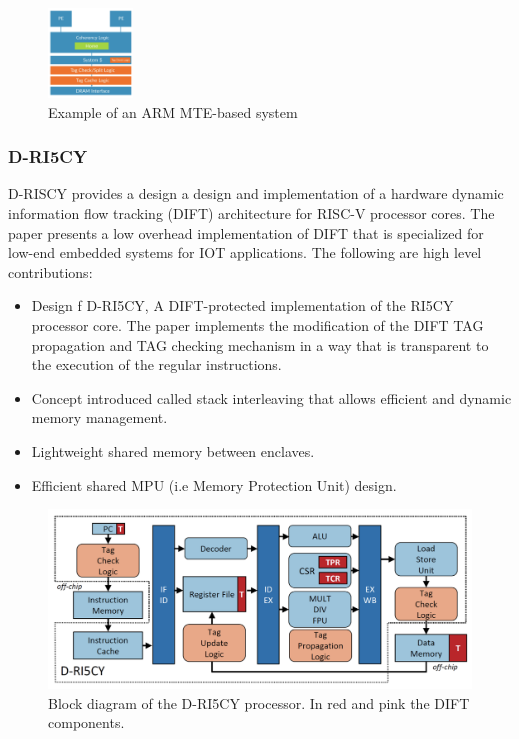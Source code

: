 \begin{figure}[htbp!] 
  \centering    
  \includegraphics[width=0.2\textwidth]{ARMMTE}
  \caption[MTE]{Example of an ARM MTE-based system \cite{ARMMTE}}
  \label{fig:MTE}
  \end{figure}

\subsubsection{D-RI5CY}
D-RISCY\cite{D-RISCY} provides a design a design and implementation of a hardware dynamic information flow 
tracking (DIFT) architecture for RISC-V processor cores. The paper presents a low 
overhead implementation of DIFT that is specialized for low-end embedded systems
for IOT applications. The following are high level contributions:
\begin{itemize}
  \item Design f D-RI5CY, A DIFT-protected implementation of the RI5CY processor core. 
        The paper implements the modification of the DIFT TAG propagation and TAG checking
        mechanism in a way that is transparent to the execution of the regular instructions. 
  \item Concept introduced called stack interleaving that allows efficient and dynamic memory management.
  \item Lightweight shared memory between enclaves.
  \item Efficient shared MPU (i.e Memory Protection Unit) design.
\end{itemize}

\begin{figure}[htbp!] 
  \centering    
  \includegraphics[width=0.6  \textwidth]{D-RISCV}
  \caption[D-RISCY]{ Block diagram of the D-RI5CY processor. In red and pink the DIFT components. \cite{D-RISCY}}
  \label{fig:MTE}
  \end{figure}

